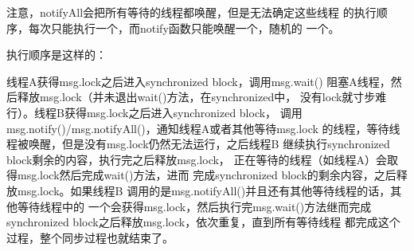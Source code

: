 \documentclass[a4paper,11pt]{article}
\begin{document}
注意，notifyAll会把所有等待的线程都唤醒，但是无法确定这些线程
的执行顺序，每次只能执行一个，而notify函数只能唤醒一个，随机的
一个。

执行顺序是这样的：

线程A获得msg.lock之后进入synchronized block，调用msg.wait()
阻塞A线程，然后释放msg.lock（并未退出wait()方法，在synchronized中，
没有lock就寸步难行）。线程B获得msg.lock之后进入synchronized block，
调用msg.notify()/msg.notifyAll()，通知线程A或者其他等待msg.lock
的线程，等待线程被唤醒，但是没有msg.lock仍然无法运行，之后线程B
继续执行synchronized block剩余的内容，执行完之后释放msg.lock，
正在等待的线程（如线程A）会取得msg.lock然后完成wait()方法，进而
完成synchronized block的剩余内容，之后释放msg.lock。如果线程B
调用的是msg.notifyAll()并且还有其他等待线程的话，其他等待线程中的
一个会获得msg.lock，然后执行完msg.wait()方法继而完成
synchronized block之后释放msg.lock，依次重复，直到所有等待线程
都完成这个过程，整个同步过程也就结束了。
\end{document}
